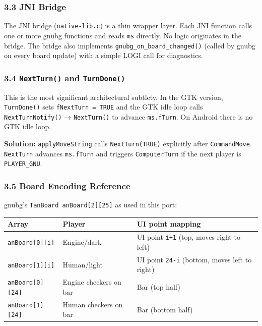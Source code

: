 \documentclass[11pt,a4paper]{article}
\begin{document}
\subsubsection{3.3 JNI Bridge}\label{jni-bridge}

The JNI bridge (\texttt{native-lib.c}) is a thin wrapper layer. Each
JNI function calls one or more gnubg functions and reads \texttt{ms}
directly. No logic originates in the bridge. The bridge also implements
\texttt{gnubg\_on\_board\_changed()} (called by gnubg on every board
update) with a simple LOGI call for diagnostics.

\subsubsection{3.4 \texttt{NextTurn()} and \texttt{TurnDone()}}\label{nextturn}

This is the most significant architectural subtlety. In the GTK version,
\texttt{TurnDone()} sets \texttt{fNextTurn = TRUE} and the GTK idle loop
calls \texttt{NextTurnNotify()} → \texttt{NextTurn()} to advance
\texttt{ms.fTurn}. On Android there is no GTK idle loop.

\textbf{Solution:} \texttt{applyMoveString} calls \texttt{NextTurn(TRUE)}
explicitly after \texttt{CommandMove}. \texttt{NextTurn} advances
\texttt{ms.fTurn} and triggers \texttt{ComputerTurn} if the next player
is \texttt{PLAYER\_GNU}.

\subsubsection{3.5 Board Encoding Reference}\label{board-encoding}

gnubg's \texttt{TanBoard anBoard[2][25]} as used in this port:

\begin{longtable}[]{@{}lll@{}}
\toprule\noalign{}
Array & Player & UI point mapping \\
\midrule\noalign{}
\endhead
\bottomrule\noalign{}
\endlastfoot
\texttt{anBoard[0][i]} & Engine/dark & UI point \texttt{i+1} (top, moves right to left) \\
\texttt{anBoard[1][i]} & Human/light & UI point \texttt{24-i} (bottom, moves left to right) \\
\texttt{anBoard[0][24]} & Engine checkers on bar & Bar (top half) \\
\texttt{anBoard[1][24]} & Human checkers on bar & Bar (bottom half) \\
\end{longtable}
\end{document}
